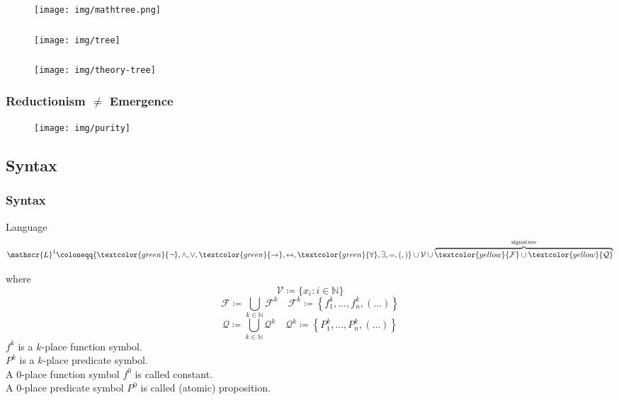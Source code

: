 \documentclass[UTF8,11pt,colorlinks,compress,openany]{beamer}%
\begin{document}
\begin{frame}\frametitle{}
	\begin{figure}
		\texttt{[image: img/mathtree.png]}
	\end{figure}
\end{frame}

\begin{frame}\frametitle{}
	\begin{figure}
		\texttt{[image: img/tree]}
	\end{figure}
\end{frame}

\begin{frame}\frametitle{}
	\begin{figure}
		\texttt{[image: img/theory-tree]}
	\end{figure}
\end{frame}

\begin{frame}\frametitle{Reductionism $\ne$ Emergence}
	\begin{figure}
		\texttt{[image: img/purity]}
	\end{figure}
\end{frame}

\subsection{Syntax}

\begin{frame}\frametitle{Syntax}
		\begin{block}{Language}
			\[\mathscr{L}^1\coloneqq \{\textcolor{green}{\neg},\wedge,\vee,\textcolor{green}{\to},\leftrightarrow,\textcolor{green}{\forall},\exists,=,(,)\}\cup\mathcal{V}\cup\overbrace{\textcolor{yellow}{\mathcal{F}}\cup\textcolor{yellow}{\mathcal{Q}}}^{\text{signature}}\]
		\end{block}
		where
		\[\mathcal{V}\coloneqq \{x_i: i\in\mathbb{N}\}\]
		\[\mathcal{F}\coloneqq \bigcup\limits_{k\in\mathbb{N}}\mathcal{F}^k\quad \mathcal{F}^k\coloneqq \left\{f_1^k,\dots,f_n^k,(\dots)\right\}\]
		\[\mathcal{Q}\coloneqq \bigcup\limits_{k\in\mathbb{N}}\mathcal{Q}^k\quad \mathcal{Q}^k\coloneqq \left\{P_1^k,\dots,P_n^k,(\dots)\right\}\]
		$f^k$ is a $k$-place function symbol.\\
		$P^k$ is a $k$-place predicate symbol.\\
		A $0$-place function symbol $f^0$ is called constant.\\
		A $0$-place predicate symbol $P^0$ is called (atomic) proposition.
\end{frame}
\end{document}
